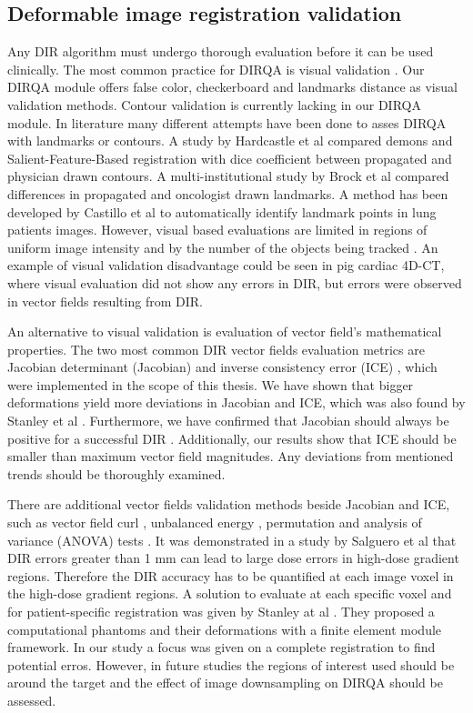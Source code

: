\documentclass[type=dr, dr=rernat, accentcolor=tud7b,colorbacktitle, bigchapter, openright, twoside, 12pt ]{tudthesis}
\begin{document}
\subsection{Deformable image registration validation}

Any DIR algorithm must undergo thorough evaluation before it can be used clinically. The most common practice for DIRQA is visual validation \cite{Stanley2013}. 
Our DIRQA module offers false color, checkerboard and landmarks distance as
visual validation methods. Contour validation is currently lacking in our DIRQA module. In literature many different attempts have been done to asses DIRQA with landmarks or contours. 
A study by Hardcastle et al \cite{Hardcastle2012} 
compared demons and Salient-Feature-Based registration with dice coefficient between propagated and physician drawn contours.
A multi-institutional study by Brock et al \cite{Brock2010} compared differences in propagated and oncologist drawn landmarks. 
A method has been developed by Castillo et al \cite{Castillo2009} to automatically identify landmark points
in lung patients images. However, visual based evaluations are limited in regions of uniform image intensity and by the number of the objects being tracked \cite{Kashani2008, Liu2012}. 
An example of visual validation disadvantage could be seen in
pig cardiac 4D-CT, where visual evaluation did not show any errors in DIR, but errors were observed in vector fields resulting from DIR.

An alternative to visual validation is evaluation of vector field's mathematical properties. The two most common DIR vector fields evaluation metrics are 
Jacobian determinant (Jacobian) and inverse consistency error (ICE) \cite{Leow2007, Christensen2001}, which were implemented in the scope of this thesis. 
We have shown that bigger deformations yield more deviations in Jacobian and ICE, which was also found by Stanley et al \cite{Stanley2013}. 
Furthermore, we have confirmed that Jacobian should always be positive for a successful DIR \cite{Rey2002}. Additionally, our results show that ICE should 
be smaller than maximum vector field magnitudes. Any deviations from mentioned trends should be thoroughly examined.

There are additional vector fields validation methods beside Jacobian and ICE, such as vector field curl \cite{Schreibmann2012}, unbalanced energy \cite{Zhong2007}, 
permutation and analysis of variance (ANOVA) tests \cite{Klein2009}.
It was demonstrated in a study by Salguero et al \cite{Salguero2011} that DIR errors greater than 1 mm can lead to large dose errors in high-dose gradient regions. 
Therefore the DIR accuracy has to be quantified at each image voxel in the high-dose 
gradient regions. A solution to evaluate at each specific voxel and for patient-specific registration was given by Stanley at al \cite{Stanley2013}. 
They proposed a computational phantoms and their deformations with a finite element module framework. 
In our study a focus was given on a complete registration to find potential erros. However, in future studies the regions of interest used
should be around the target and the effect of image downsampling on DIRQA should be assessed.
\end{document}
